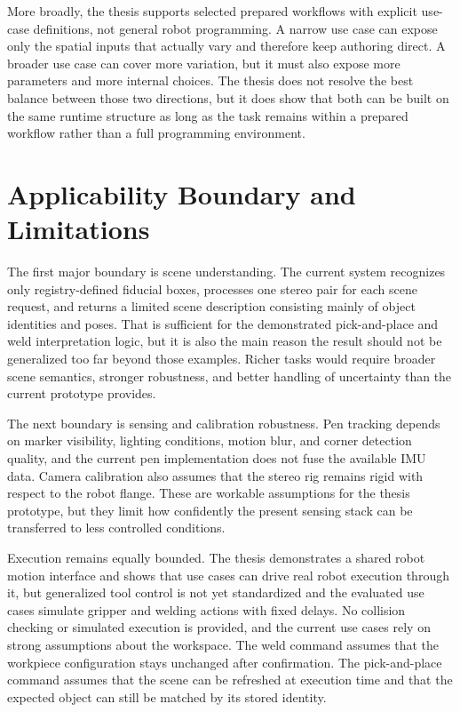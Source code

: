 More broadly, the thesis supports selected prepared workflows with explicit use-case definitions, not general robot programming. A narrow use case can expose only the spatial inputs that actually vary and therefore keep authoring direct. A broader use case can cover more variation, but it must also expose more parameters and more internal choices. The thesis does not resolve the best balance between those two directions, but it does show that both can be built on the same runtime structure as long as the task remains within a prepared workflow rather than a full programming environment.

\section{Applicability Boundary and Limitations}

The first major boundary is scene understanding. The current system recognizes only registry-defined fiducial boxes, processes one stereo pair for each scene request, and returns a limited scene description consisting mainly of object identities and poses. That is sufficient for the demonstrated pick-and-place and weld interpretation logic, but it is also the main reason the result should not be generalized too far beyond those examples. Richer tasks would require broader scene semantics, stronger robustness, and better handling of uncertainty than the current prototype provides.

The next boundary is sensing and calibration robustness. Pen tracking depends on marker visibility, lighting conditions, motion blur, and corner detection quality, and the current pen implementation does not fuse the available IMU data. Camera calibration also assumes that the stereo rig remains rigid with respect to the robot flange. These are workable assumptions for the thesis prototype, but they limit how confidently the present sensing stack can be transferred to less controlled conditions.

Execution remains equally bounded. The thesis demonstrates a shared robot motion interface and shows that use cases can drive real robot execution through it, but generalized tool control is not yet standardized and the evaluated use cases simulate gripper and welding actions with fixed delays. No collision checking or simulated execution is provided, and the current use cases rely on strong assumptions about the workspace. The weld command assumes that the workpiece configuration stays unchanged after confirmation. The pick-and-place command assumes that the scene can be refreshed at execution time and that the expected object can still be matched by its stored identity.

